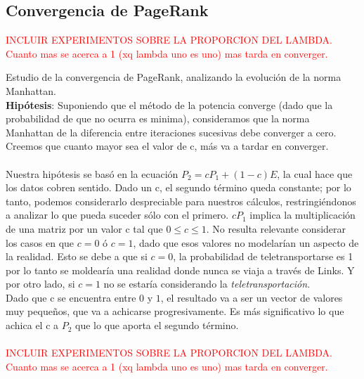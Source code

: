 \documentclass[a4paper]{article}
\begin{document}
\subsection{Convergencia de PageRank}

\textcolor{red}{INCLUIR EXPERIMENTOS SOBRE LA PROPORCION DEL LAMBDA. Cuanto mas se acerca a 1 (xq lambda uno es uno) mas tarda en converger.}

Estudio de la convergencia de PageRank, analizando la evolución de la norma Manhattan.\\
\textbf{Hip\'otesis}: Suponiendo que el método de la potencia converge (dado que la probabilidad de que no ocurra es minima), consideramos que la norma Manhattan de la diferencia entre iteraciones sucesivas debe converger a cero. Creemos que cuanto mayor sea el valor de c, más va a tardar en converger.\\
\\
\indent Nuestra hip\'otesis se bas\'o en la ecuaci\'on $P_2= cP_1+(1-c)E$, la cual hace que los datos cobren sentido. Dado un c, el segundo t\'ermino queda constante; por lo tanto, podemos considerarlo despreciable para nuestros cálculos, restringiéndonos a analizar lo que pueda suceder s\'olo con el primero. $cP_1$ implica la multiplicación de una matriz por un valor c tal que $0 \leq c \leq 1$. No resulta relevante considerar los casos en que $c= 0$ \'o $c=1$, dado que esos valores no modelarían un aspecto de la realidad. Esto se debe a que si $c=0$, la probabilidad de teletransportarse es 1 por lo tanto se moldear\'ia una realidad donde nunca se viaja a trav\'es de Links. Y por otro lado, si $c=1$ no se estar\'ia considerando la \emph{teletransportaci\'on}. \\
\indent Dado que c se encuentra entre $0$ y $1$, el resultado va a ser un vector de valores muy pequeños, que va a achicarse progresivamente. Es m\'as significativo lo que achica el c a $P_2$ que lo que aporta el segundo t\'ermino.   \\
\\
\textcolor{red}{INCLUIR EXPERIMENTOS SOBRE LA PROPORCION DEL LAMBDA. Cuanto mas se acerca a 1 (xq lambda uno es uno) mas tarda en converger.}\\
\end{document}
